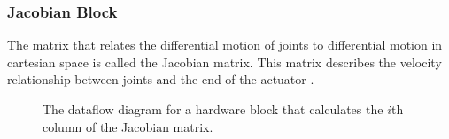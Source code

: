 \subsubsection{Jacobian Block}

The matrix that relates the differential motion of joints to differential motion in cartesian space is called the Jacobian matrix. This matrix describes the velocity relationship between joints and the end of the actuator \cite{jacobian}.

\begin{figure}[ht]
\center
{}
\caption{The dataflow diagram for a hardware block that calculates the $i$th column of the Jacobian matrix.}
\label{fig:jacobian}
\end{figure}

